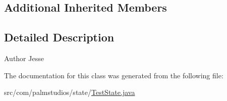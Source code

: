 \subsection*{Additional Inherited Members}


\subsection{Detailed Description}
\begin{DoxyAuthor}{Author}
Jesse 
\end{DoxyAuthor}


The documentation for this class was generated from the following file\+:\begin{DoxyCompactItemize}
\item 
src/com/palmstudios/state/\hyperlink{_test_state_8java}{Test\+State.\+java}\end{DoxyCompactItemize}

